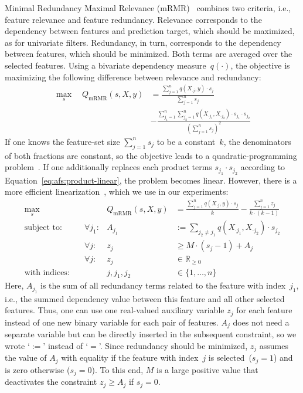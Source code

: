 \documentclass{article}
\theoremstyle{definition}
\begin{document}
Minimal Redundancy Maximal Relevance (mRMR)~\cite{peng2005feature} combines two criteria, i.e., feature relevance and feature redundancy.
Relevance corresponds to the dependency between features and prediction target, which should be maximized, as for univariate filters.
Redundancy, in turn, corresponds to the dependency between features, which should be minimized.
Both terms are averaged over the selected features.
Using a bivariate dependency measure~$q(\cdot)$, the objective is maximizing the following difference between relevance and redundancy:
%
\begin{equation}
	\begin{aligned}
		\max_s \quad Q_{\text{mRMR}}(s,X,y) &= \frac{\sum_{j=1}^{n} q(X_{\cdot{}j},y) \cdot s_j}{\sum_{j=1}^{n} s_j} \\
		&- \frac{\sum_{j_1=1}^{n} \sum_{j_2=1}^{n} q(X_{\cdot{}j_1}, X_{\cdot{}j_2}) \cdot s_{j_1} \cdot s_{j_2}}{(\sum_{j=1}^{n} s_j)^2}
	\end{aligned}
	\label{eq:afs:mrmr}
\end{equation}
%
If one knows the feature-set size $\sum_{j=1}^{n} s_j$ to be a constant~$k$, the denominators of both fractions are constant, so the objective leads to a quadratic-programming problem~\cite{nguyen2014effective, rodriguez2010quadratic}.
If one additionally replaces each product terms $s_{j_1} \cdot s_{j_2}$ according to Equation~\ref{eq:afs:product-linear}, the problem becomes linear.
However, there is a more efficient linearization~\cite{nguyen2009optimizing, nguyen2010towards}, which we use in our experiments:
%
\begin{equation}
	\begin{aligned}
		\max_s &\quad & Q_{\text{mRMR}}(s,X,y) &= \frac{\sum_{j=1}^{n} q(X_{\cdot{}j},y) \cdot s_j}{k} - \frac{\sum_{j=1}^{n} z_j}{k \cdot (k-1)} \\
		\text{subject to:} &\quad \forall j_1: & A_{j_1} &:= \sum_{j_2 \neq j_1} q(X_{\cdot{}j_1}, X_{\cdot{}j_2}) \cdot s_{j_2} \\
		&\quad \forall j: & z_j &\geq M \cdot (s_j - 1) + A_j \\
		&\quad \forall j: & z_j &\in \mathbb{R}_{\geq 0} \\
		\text{with indices:} &\quad & j, j_1, j_2 &\in \{1, \dots, n\}
	\end{aligned}
	\label{eq:afs:mrmr-linear}
\end{equation}
%
Here, $A_{j_1}$ is the sum of all redundancy terms related to the feature with index~$j_1$, i.e., the summed dependency value between this feature and all other selected features.
Thus, one can use one real-valued auxiliary variable $z_j$ for each feature instead of one new binary variable for each pair of features.
$A_j$ does not need a separate variable but can be directly inserted in the subsequent constraint, so we wrote `$:=$' instead of `$=$'.
Since redundancy should be minimized, $z_j$ assumes the value of $A_j$ with equality if the feature with index~$j$ is selected~($s_j=1$) and is zero otherwise ($s_j=0$).
To this end, $M$ is a large positive value that deactivates the constraint $z_j \geq A_j$ if $s_j=0$.
\end{document}
